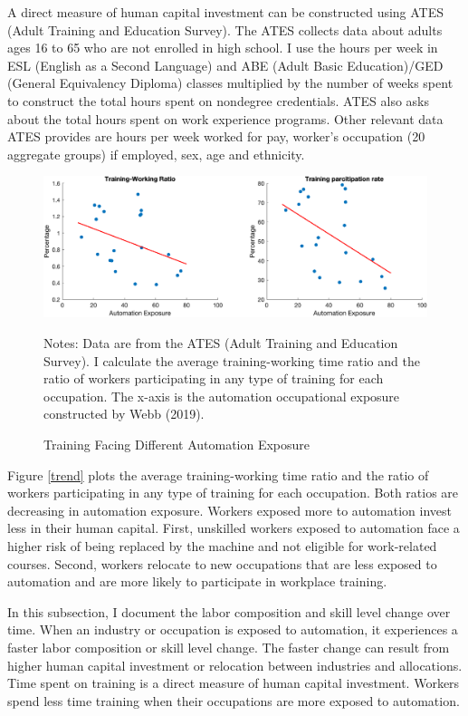 \documentclass[12pt]{article}
\begin{document}
A direct measure of human capital investment can be constructed using ATES (Adult Training and Education Survey). The ATES collects data about adults ages 16 to 65 who are not enrolled in high school. I use the hours per week in ESL (English as a Second Language) and ABE (Adult Basic Education)/GED (General Equivalency Diploma) classes multiplied by the number of weeks spent to construct the total hours spent on nondegree credentials. ATES also asks about the total hours spent on work experience programs. Other relevant data ATES provides are hours per week worked for pay, worker's occupation (20 aggregate groups) if employed, sex, age and ethnicity. 

\begin{figure}[h!]
\includegraphics[width = \textwidth]{train}
\caption{Training Facing Different Automation Exposure}
{\scriptsize Notes: Data are from the ATES (Adult Training and Education Survey). I calculate the average training-working time ratio and the ratio of workers participating in any type of training for each occupation. The x-axis is the automation occupational exposure constructed by Webb (2019).}
\label{train}
\end{figure}

Figure \ref{trend} plots the average training-working time ratio and the ratio of workers participating in any type of training for each occupation. Both ratios are decreasing in automation exposure. Workers exposed more to automation invest less in their human capital. First, unskilled workers exposed to automation face a higher risk of being replaced by the machine and not eligible for work-related courses. Second, workers relocate to new occupations that are less exposed to automation and are more likely to participate in workplace training. 

In this subsection, I document the labor composition and skill level change over time. When an industry or occupation is exposed to automation, it experiences a faster labor composition or skill level change. The faster change can result from higher human capital investment or relocation between industries and allocations. Time spent on training is a direct measure of human capital investment. Workers spend less time training when their occupations are more exposed to automation. 
\end{document}
